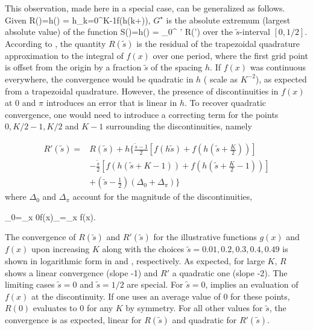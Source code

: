 This observation, made here in a special case, can be generalized as follows.
%
Given
%
R()=h() = h\sum\limits_{k=0}^{K-1}f(h(k+)),
\eeq
%
$G^\star$ is the absolute extremum (largest absolute value) of the function
%
S()=h() = \int\limits_{0}^{} ' R(')
\eeq
%
over the $\tilde{s}$-interval $[0,1/2]$.
%
According to , the quantity $R(\tilde{s})$ is the residual of the trapezoidal quadrature approximation to the integral of $f(x)$ over one period, where the first grid point is offset from the origin by a fraction $\tilde{s}$ of the spacing $h$. 
%
If $f(x)$ was continuous everywhere, the convergence would be quadratic in $h$ (\ie{} scale as $K^{-2}$), as expected from a trapezoidal quadrature. However, the presence of discontinuities in $f(x)$ at $0$ and $\pi$ introduces an error that is linear in $h$.
%
To recover quadratic convergence, one would need to introduce a correcting term for the points $0,K/2-1,K/2$ and $K-1$ surrounding the discontinuities, namely

\begin{align}
\label{eq:r_prime_of_s_tilde}
R'(\tilde{s})=&R(\tilde{s}) + h 
   \bigg\{
    \frac{\tilde{s} - 1}{2} 
    \left  [
      f(h\tilde{s}) + f\left (h\left(\tilde{s}+\frac{K}{2}\right)\right)
    \right ] \nonumber \\
    &- 
     \frac{\tilde{s}}{2} 
    \left  [
      f(h(\tilde{s}+K-1)) + f\left(h\left(\tilde{s}+\frac{K}{2}-1\right)\right)
    \right ] \nonumber \\
    & + \left(\tilde{s} -\frac{1}{2}\right)
    \left ( 
      \Delta_0 + \Delta_\pi
    \right )
  \bigg \}
\end{align}
%
where $\Delta_0$ and $\Delta_\pi$ account for the magnitude of the discontinuities, \ie

\Delta_0=\lim_{x\xrightarrow{>} 0}f(x)\quad{}\quad\Delta_\pi=\lim_{x\xrightarrow{>} \pi}f(x).
\eeq

The convergence of $R(\tilde{s})$ and $R'(\tilde{s})$ for the illustrative functions
$g(x)$ and $f(x)$ upon increasing $K$ along with the choices $\tilde{s}=0.01, 0.2, 0.3, 0.4,0.49$ 
is shown in  logarithmic form in  and , respectively.
%
As expected, for large $K$, $R$ shows a linear convergence (slope -1) and $R'$
a quadratic one (slope -2). 
%
The limiting cases $\tilde{s}=0$ and $\tilde{s}=1/2$ are special. For $\tilde{s}=0$, 
implies an evaluation of $f(x)$ at the discontinuity. If one uses an average value of $0$ for these points, $R(0)$ evaluates to 0 for any $K$ by symmetry. 
For all other values for $\tilde{s}$, the convergence is as expected, \ie{} linear for $R(\tilde{s})$ and quadratic for $R'(\tilde{s})$.

